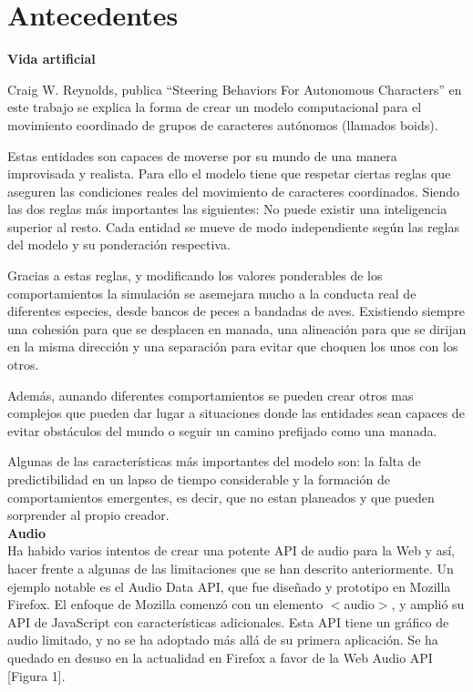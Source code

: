 \section{Antecedentes}
\label{section:antecedentes}
\noindent\textbf{Vida artificial}

Craig W. Reynolds, publica “Steering Behaviors For Autonomous Characters” en este trabajo se explica la forma de crear un modelo computacional para el movimiento 
coordinado de grupos de caracteres autónomos (llamados boids).
 
Estas entidades son capaces de moverse por su mundo de una manera improvisada y realista. Para ello el modelo tiene que respetar ciertas reglas que aseguren las condiciones reales 
del movimiento de caracteres coordinados. Siendo las dos reglas más importantes las siguientes:
No puede existir una inteligencia superior al resto.
Cada entidad se mueve de modo independiente según las reglas del modelo y su ponderación respectiva.
 
Gracias a estas reglas, y modificando los valores ponderables de los comportamientos la simulación se asemejara mucho a la conducta real de diferentes especies, desde bancos de 
peces a bandadas de aves. Existiendo siempre una cohesión para que se desplacen en manada, una alineación para que se dirijan en la misma dirección y una separación para evitar que
choquen los unos con los otros.
 
Además, aunando diferentes comportamientos se pueden crear otros mas complejos que pueden dar lugar a situaciones donde las entidades sean capaces de evitar obstáculos del mundo o 
seguir un camino prefijado como una manada.
 
Algunas de las características más importantes del modelo son: la falta de predictibilidad en un lapso de tiempo considerable y la formación de comportamientos emergentes, es decir, 
que no estan planeados y que pueden sorprender al propio creador.\\

\noindent\textbf{Audio}\\
Ha habido varios intentos de crear una potente API de audio para la Web y así,  hacer frente a algunas de las limitaciones que se han descrito anteriormente.  Un ejemplo notable es el Audio Data API,  que fue diseñado y prototipo en Mozilla Firefox.  El enfoque de Mozilla comenzó con un elemento $<$audio$>$, y amplió su API de JavaScript con características adicionales. Esta API tiene un gráfico de audio limitado, y no se ha adoptado más allá de su primera aplicación. Se ha quedado en desuso en la actualidad en Firefox a favor de la Web Audio API [Figura 1].

